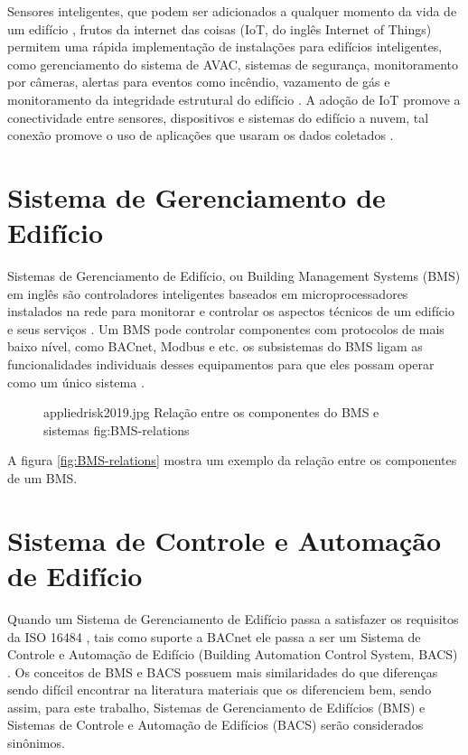 Sensores inteligentes, que podem ser adicionados a qualquer momento da vida de um edifício \cite{Kamal2021}, frutos da internet das coisas (IoT, do inglês Internet of Things) permitem uma rápida implementação de instalações para edifícios inteligentes, como gerenciamento do sistema de AVAC, sistemas de segurança, monitoramento por câmeras, alertas para eventos como incêndio, vazamento de gás e monitoramento da integridade estrutural do edifício \cite{Bellini2022}. A adoção de IoT promove a conectividade entre sensores, dispositivos e sistemas do edifício a nuvem, tal conexão promove o uso de aplicações que usaram os dados coletados \cite{Berkoben2020}.

\section{Sistema de Gerenciamento de Edifício}
Sistemas de Gerenciamento de Edifício, ou Building Management Systems (BMS) em inglês são controladores inteligentes baseados em microprocessadores instalados na rede para monitorar e controlar os aspectos técnicos de um edifício e seus serviços \cite{appliedrisk2019}. Um BMS pode controlar componentes com protocolos de mais baixo nível, como BACnet, Modbus e etc. \cite{Berkoben2020} os subsistemas do BMS ligam as funcionalidades individuais desses equipamentos para que eles possam operar como um único sistema \cite{appliedrisk2019}.
\begin{figure}[h!]
    {appliedrisk2019.jpg}                 %
    {Relação entre os componentes do BMS e sistemas}     %
    {fig:BMS-relations}                      %
\end{figure}
A figura \ref{fig:BMS-relations} mostra um exemplo da relação entre os componentes de um BMS.
 

\section{Sistema de Controle e Automação de Edifício}
Quando um Sistema de Gerenciamento de Edifício passa a satisfazer os requisitos da ISO 16484 \cite{ISO16484}, tais como suporte a BACnet ele passa a ser um Sistema de Controle e Automação de Edifício (Building Automation Control System, BACS) \cite{docsuspeito2006}. Os conceitos de BMS e BACS possuem mais similaridades do que diferenças sendo difícil encontrar na literatura materiais que os diferenciem bem, sendo assim, para este trabalho, Sistemas de Gerenciamento de Edifícios (BMS) e Sistemas de Controle e Automação de Edifícios (BACS) serão considerados sinônimos.

